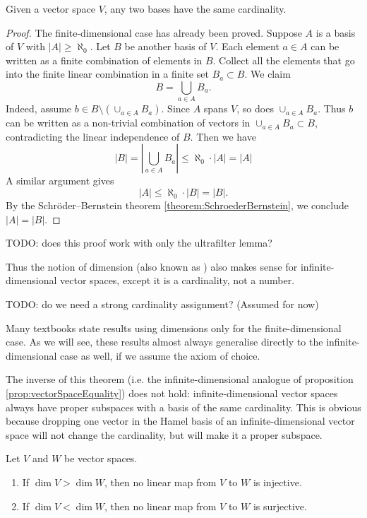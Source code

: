 \begin{theorem}
Given a vector space $V$, any two bases have the same cardinality.
\end{theorem}
\begin{proof}
The finite-dimensional case has already been proved. Suppose $A$ is a basis of $V$ with $|A| \geq \aleph_0$. Let $B$ be another basis of $V$. Each element $a\in A$ can be written as a finite combination of elements in $B$. Collect all the elements that go into the finite linear combination in a finite set $B_a \subset B$. We claim
\[ B = \bigcup_{a\in A} B_a. \]
Indeed, assume $b\in B \setminus (\cup_{a\in A} B_a)$. Since $A$ spans $V$, so does $\cup_{a\in A} B_a$. Thus $b$ can be written as a non-trivial combination of vectors in $\cup_{a\in A} B_a\subset B$, contradicting the linear independence of $B$. Then we have
\[ |B| = \left| \bigcup_{a\in A}B_a \right| \leq \aleph_0 \cdot |A| = |A| \]
A similar argument gives
\[ |A| \leq \aleph_0 \cdot |B| = |B|. \]
By the Schröder–Bernstein theorem \ref{theorem:SchroederBernstein}, we conclude $|A| = |B|$.
\end{proof}
TODO: does this proof work with only the ultrafilter lemma?

Thus the notion of dimension (also known as ) also makes sense for infinite-dimensional vector spaces, except it is a cardinality, not a number.

TODO: do we need a strong cardinality assignment? (Assumed for now)

Many textbooks state results using dimensions only for the finite-dimensional case. As we will see, these results almost always generalise directly to the infinite-dimensional case as well, if we assume the axiom of choice.

\begin{note}
The inverse of this theorem (i.e. the infinite-dimensional analogue of proposition \ref{prop:vectorSpaceEquality}) does not hold: infinite-dimensional vector spaces always have proper subspaces with a basis of the same cardinality. This is obvious because dropping one vector in the Hamel basis of an infinite-dimensional vector space will not change the cardinality, but will make it a proper subspace.
\end{note}

 \begin{corollary}
 Let $V$ and $W$ be vector spaces.
 \begin{enumerate}
 \item If $\dim V > \dim W$, then no linear map from $V$ to $W$ is injective.
 \item If $\dim V < \dim W$, then no linear map from $V$ to $W$ is surjective.
 \end{enumerate}
 \end{corollary}

